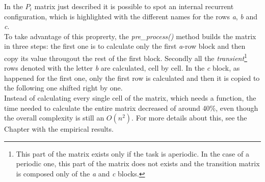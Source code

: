 In the \( P_{i} \) matrix just described it is possible to spot an internal recurrent configuration, which is highlighted with the different names for the rows \emph{a}, \emph{b} and \emph{c}.\\
To take advantage of this proprerty, the \emph{pre\_process()} method builds the matrix in three steps: the first one is to calculate only the first \emph{a}-row block and then copy its value througout the rest of the first block. Secondly all the \emph{transient}\footnote{This part of the matrix exists only if the task is aperiodic. In the case of a periodic one, this part of the matrix does not exists and the transition matrix is composed only of the \emph{a} and \emph{c} blocks.} rows denoted with the letter \emph{b} are calculated, cell by cell. In the \emph{c} block, as happened for the first one, only the first row is calculated and then it is copied to the following one shifted right by one.\\
Instead of calculating every single cell of the matrix, which needs a function, the time needed to calculate the entire matrix decreased of around 40\%, even though the overall complexity is still an \( O(n^{2}) \). For more details about this, see the Chapter with the empirical results.
%
% 
